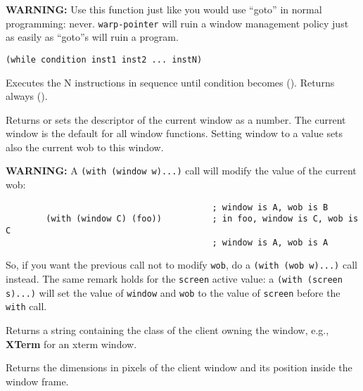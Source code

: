 {\bf WARNING:} Use this function just like you would use ``goto'' in
normal programming: never. \verb"warp-pointer" will ruin a window management policy
just as easily as  ``goto''s will ruin a program.

        
{\usagefont\begin{verbatim}
(while condition inst1 inst2 ... instN)
\end{verbatim}}\usageupspace

Executes the N instructions in sequence until condition becomes ().  Returns
always ().      

        

Returns or sets the descriptor of the current window as a {\WOOL} number. The
current window is the default for all window functions. Setting window
to a value sets also the current wob to this window.

{\bf WARNING:} A \verb"(with (window w)...)" call will modify the value of
the current wob:
{\exemplefont\begin{verbatim}
                                         ; window is A, wob is B
        (with (window C) (foo))          ; in foo, window is C, wob is C
                                         ; window is A, wob is A
\end{verbatim}}
So, if you want the previous call not to modify \verb"wob", do a 
\verb"(with (wob w)...)" call instead. The same remark holds for the 
\verb"screen" active value: a \verb"(with (screen s)...)" will set the value
of {\tt window} and {\tt wob} to the value of {\tt screen} before the 
{\tt with} call.


        

Returns a string containing the class of the client owning the window,
e.g., {\bf XTerm} for an xterm window.

        

Returns the dimensions in pixels of the client window and its position
inside the {\GWM} window frame.

        
